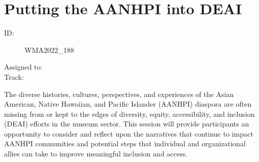 \documentclass{report}
\begin{document}
              
        
          \newpage
          \section{ Putting the AANHPI into DEAI }
            \begin{description}
              \item [ID:]
              WMA2022\_188

              \item [Assigned to:]
                \item [Track:]
              \end{description}

              The diverse histories, cultures, perspectives, and experiences of the Asian American, Native Hawaiian, and Pacific Islander (AANHPI) diaspora are often missing from or kept to the edges of diversity, equity, accessibility, and inclusion (DEAI) efforts in the museum sector. This session will provide participants an opportunity to consider and reflect upon the narratives that continue to impact AANHPI communities and potential steps that individual and organizational allies can take to improve meaningful inclusion and access.
\end{document}
